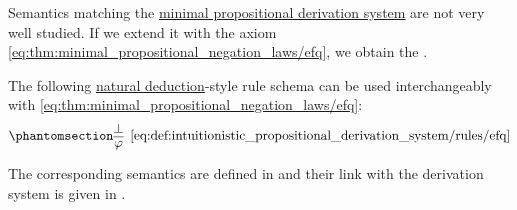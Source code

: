 \begin{definition}\label{def:intuitionistic_propositional_derivation_system}
  Semantics matching the \hyperref[def:minimal_propositional_derivation_system]{minimal propositional derivation system} are not very well studied. If we extend it with the axiom \eqref{eq:thm:minimal_propositional_negation_laws/efq}, we obtain the .

   The following \hyperref[thm:minimal_natural_deduction]{natural deduction}-style rule schema can be used interchangeably with \eqref{eq:thm:minimal_propositional_negation_laws/efq}:
  \begin{equation*}\taglabel[\textrm{R} \textrm{EFQ}]{eq:def:intuitionistic_propositional_derivation_system/rules/efq}
    \begin{prooftree}
      \hypo{ \bot }
      \infer1[\ref{eq:def:intuitionistic_propositional_derivation_system/rules/efq}]{ \varphi }
    \end{prooftree}
  \end{equation*}

  The corresponding semantics are defined in  and their link with the derivation system is given in .
\end{definition}


